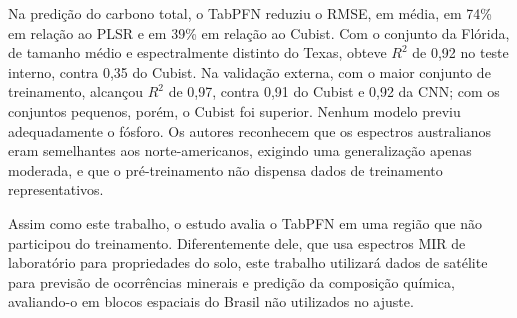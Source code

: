 Na predição do carbono total, o TabPFN reduziu o RMSE, em média, em 74\% em relação ao PLSR e em 39\% em relação ao Cubist. Com o conjunto da Flórida, de tamanho médio e espectralmente distinto do Texas, obteve $R^2$ de 0,92 no teste interno, contra 0,35 do Cubist. Na validação externa, com o maior conjunto de treinamento, alcançou $R^2$ de 0,97, contra 0,91 do Cubist e 0,92 da CNN; com os conjuntos pequenos, porém, o Cubist foi superior. Nenhum modelo previu adequadamente o fósforo. Os autores reconhecem que os espectros australianos eram semelhantes aos norte-americanos, exigindo uma generalização apenas moderada, e que o pré-treinamento não dispensa dados de treinamento representativos.

Assim como este trabalho, o estudo avalia o TabPFN em uma região que não participou do treinamento. Diferentemente dele, que usa espectros MIR de laboratório para propriedades do solo, este trabalho utilizará dados de satélite para previsão de ocorrências minerais e predição da composição química, avaliando-o em blocos espaciais do Brasil não utilizados no ajuste.